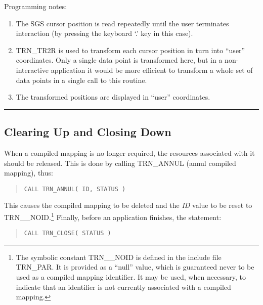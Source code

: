 \documentclass[twoside,11pt]{article}
\newcommand{\xlabel}[1]{}
\newcommand{\name}[1]{\mbox{\small{#1}}}
\newcommand{\fortvar}[1]{\mbox{\emph{#1}}}
\newcommand{\exampledone}[0]{\begin{center} \rule{6em}{0.2mm} \end{center}}
\begin{document}
Programming notes:

\begin{enumerate}

\item The \name{SGS} cursor position is read repeatedly until the user
terminates interaction (by pressing the keyboard `.' key in this case). 

\item \name{TRN\_TR2R} is used to transform each cursor position in turn
into ``user'' coordinates. 
Only a single data point is transformed here, but in a non-interactive
application it would be more efficient to transform a whole set of data
points in a single call to this routine. 

\item The transformed positions are displayed in ``user'' coordinates.

\end{enumerate}
\exampledone


\subsection{\xlabel{clearing_up_and_closing_down}Clearing Up and Closing Down}

\label{section:simple:cleanup}

When a compiled mapping is no longer required, the resources associated with
it should be released. 
This is done by calling \name{TRN\_ANNUL} (annul compiled mapping), thus:

\begin{quote}
\begin{verbatim}
CALL TRN_ANNUL( ID, STATUS )
\end{verbatim}
\end{quote}

This causes the compiled mapping to be deleted and the \fortvar{ID} value
to be reset to \name{TRN\_\_NOID}.\footnote{ 
The symbolic constant \name{TRN\_\_NOID} is defined in the include file 
\name{TRN\_PAR}.
It is provided as a ``null'' value, which is guaranteed never to be used as
a compiled mapping identifier. 
It may be used, when necessary, to indicate that an identifier is not
currently associated with a compiled mapping.} 
Finally, before an application finishes, the statement: 

\begin{quote}
\begin{verbatim}
CALL TRN_CLOSE( STATUS )
\end{verbatim}
\end{quote}
\end{document}
